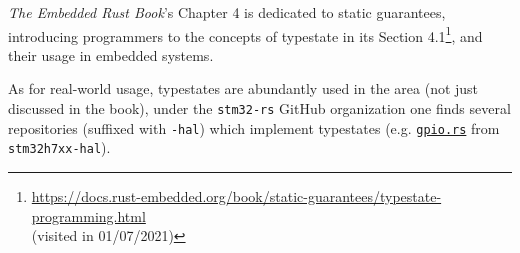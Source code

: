 \emph{The Embedded Rust Book}'s Chapter 4 is dedicated to static guarantees,
introducing programmers to the concepts of typestate in its Section 4.1\footnote{\url{https://docs.rust-embedded.org/book/static-guarantees/typestate-programming.html}\\(visited in 01/07/2021)},
and their usage in embedded systems.

As for real-world usage, typestates are abundantly used in the area (not just discussed in the book),
under the \texttt{stm32-rs} GitHub organization one finds several repositories (suffixed with \texttt{-hal})
which implement typestates
(e.g. \href{https://github.com/stm32-rs/stm32h7xx-hal/blob/master/src/gpio.rs#L51-L128}{\texttt{gpio.rs}}
from \texttt{stm32h7xx-hal}).


